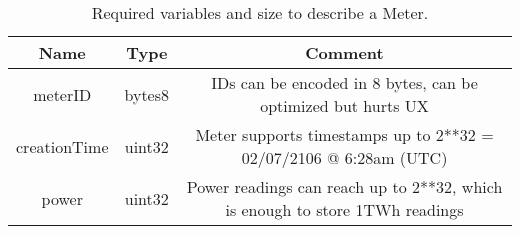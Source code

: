 \begin{table}[H]
	\centering
	\vspace*{-1ex}
	\scriptsize
	\vspace{-1ex}
	\caption{Required variables and size to describe a Meter.}
	\begin{tabular}{|c|c|c|}
        \hline
        \textbf{Name} & \textbf{Type}  & \textbf{Comment}\\ \hline 
        meterID      & bytes8         & IDs can be encoded in 8 bytes, can be optimized but hurts UX\\
        creationTime  & uint32         & Meter supports timestamps up to 2**32 = 02/07/2106 @ 6:28am (UTC) \\
        power         & uint32          & Power readings can reach up to 2**32, which is enough to store 1TWh readings \\
        \hline
    \end{tabular}
    \label{table:meter}
\end{table}